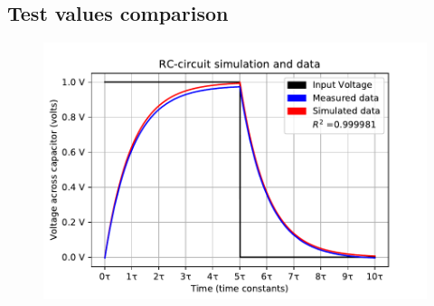 \subsection{Test values comparison}
\begin{figure}[H]
 \includegraphics{fig/img/eks_1.pdf}
 \end{figure}


